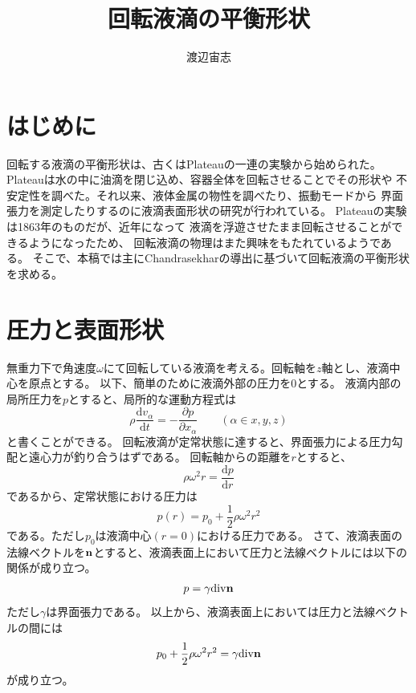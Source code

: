\documentclass{jarticle}
\title{回転液滴の平衡形状}
\author{渡辺宙志}
\affiliation{慶應義塾大学理工学部物理情報工学科}
\newcommand{\diff}{\mathrm d}
\renewcommand{\v}[1]{{\bf #1}}
\begin{document}
\maketitle

\section{はじめに}

回転する液滴の平衡形状は、古くはPlateauの一連の実験から始められた。
Plateauは水の中に油滴を閉じ込め、容器全体を回転させることでその形状や
不安定性を調べた。それ以来、液体金属の物性を調べたり、振動モードから
界面張力を測定したりするのに液滴表面形状の研究が行われている。
Plateauの実験は1863年のものだが、近年になって
液滴を浮遊させたまま回転させることができるようになったため\cite{Hill}、
回転液滴の物理はまた興味をもたれているようである。
そこで、本稿では主にChandrasekharの導出に基づいて回転液滴の平衡形状を求める\cite{Chandrasekhar}。

\section{圧力と表面形状}

無重力下で角速度$\omega$にて回転している液滴を考える。回転軸を$z$軸とし、液滴中心を原点とする。
以下、簡単のために液滴外部の圧力を0とする。
液滴内部の局所圧力を$p$とすると、局所的な運動方程式は
\begin{equation}
\rho \frac{\diff v_\alpha}{\diff t} = - \frac{\partial p}{\partial x_\alpha} \qquad (\alpha \in {x,y,z})
\end{equation}
と書くことができる。
回転液滴が定常状態に達すると、界面張力による圧力勾配と遠心力が釣り合うはずである。
回転軸からの距離を$r$とすると、
\begin{equation}
\rho \omega^2 r = \frac{\diff p}{\diff r}
\end{equation}
であるから、定常状態における圧力は
\begin{equation}
p(r) = p_0 + \frac{1}{2} \rho \omega^2 r^2 
\end{equation}
である。ただし$p_0$は液滴中心$(r=0)$における圧力である。
さて、液滴表面の法線ベクトルを$\v{n}$とすると、液滴表面上において圧力と法線ベクトルには以下の関係が成り立つ。
\begin{equation}
p = \gamma \mathrm{div} \v{n}
\end{equation}
ただし$\gamma$は界面張力である。
以上から、液滴表面上においては圧力と法線ベクトルの間には
\begin{equation}
p_0 +\frac{1}{2} \rho \omega^2 r^2  = \gamma \mathrm{div} \v{n} \label{eq::pressure_gamma}
\end{equation}
が成り立つ。
\end{document}
